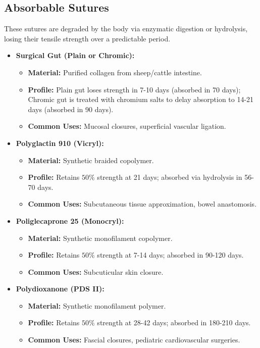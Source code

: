 \subsection*{Absorbable Sutures}
These sutures are degraded by the body via enzymatic digestion or hydrolysis, losing their tensile strength over a predictable period.
\begin{itemize}
  \item \textbf{Surgical Gut (Plain or Chromic):}
  \begin{itemize}
    \item \textbf{Material:} Purified collagen from sheep/cattle intestine.
    \item \textbf{Profile:} Plain gut loses strength in 7-10 days (absorbed in 70 days); Chromic gut is treated with chromium salts to delay absorption to 14-21 days (absorbed in 90 days).
    \item \textbf{Common Uses:} Mucosal closures, superficial vascular ligation.
  \end{itemize}
  \item \textbf{Polyglactin 910 (Vicryl):}
  \begin{itemize}
    \item \textbf{Material:} Synthetic braided copolymer.
    \item \textbf{Profile:} Retains $50\%$ strength at 21 days; absorbed via hydrolysis in 56-70 days.
    \item \textbf{Common Uses:} Subcutaneous tissue approximation, bowel anastomosis.
  \end{itemize}
  \item \textbf{Poliglecaprone 25 (Monocryl):}
  \begin{itemize}
    \item \textbf{Material:} Synthetic monofilament copolymer.
    \item \textbf{Profile:} Retains $50\%$ strength at 7-14 days; absorbed in 90-120 days.
    \item \textbf{Common Uses:} Subcuticular skin closure.
  \end{itemize}
  \item \textbf{Polydioxanone (PDS II):}
  \begin{itemize}
    \item \textbf{Material:} Synthetic monofilament polymer.
    \item \textbf{Profile:} Retains $50\%$ strength at 28-42 days; absorbed in 180-210 days.
    \item \textbf{Common Uses:} Fascial closures, pediatric cardiovascular surgeries.
  \end{itemize}
\end{itemize}

